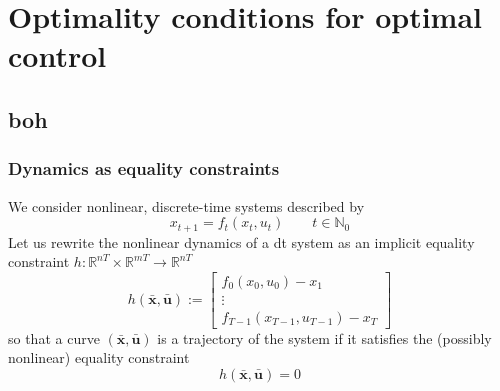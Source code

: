\documentclass[openany]{book}
\newcommand{\R}{\mathbb{R}} %
\newcommand{\N}{\mathbb{N}} %
\newcommand{\traj}{(\bar{\mathbf{x}},\bar{\mathbf{u}})} %
\theoremstyle{definition}
\theoremstyle{remark}
\begin{document}

\chapter{Optimality conditions for optimal control}
\section{boh}
\subsection{Dynamics as equality constraints}
We consider nonlinear, discrete-time systems described by 
\begin{equation} \label{system2}
    x_{t+1} = f_t(x_t,u_t) \qquad t\in\N_0
\end{equation}
Let us rewrite the nonlinear dynamics of a dt system as an implicit equality constraint $h:\R^{nT}\times \R^{mT}\to\R^{nT}$ 
\[
    h\traj:=\begin{bmatrix}
        f_0(x_0,u_0)-x_1 \\ \vdots \\ f_{T-1}(x_{T-1},u_{T-1})-x_T
    \end{bmatrix}
\]
so that a curve $\traj$ is a trajectory of the system if it satisfies the (possibly nonlinear) equality constraint 
\[
    h\traj = 0
\]
\end{document}
